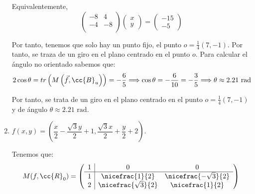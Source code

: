 \begin{ejercicio}
\begin{enumerate}
        Equivalentemente,
        \begin{equation*}
            \left(
            \begin{array}{cc}
                -8 & 4 \\
                -4 & -8 \\
            \end{array}
            \right)
            \left(
            \begin{array}{c}
                x\\y
            \end{array}
            \right)
            = \left(
            \begin{array}{c}
                -15\\-5
            \end{array}
            \right)
        \end{equation*}

        Por tanto, tenemos que solo hay un punto fijo, el punto $o=\frac{1}{4}(7,-1)$. Por tanto, se traza de un giro en el plano centrado en el punto $o$. Para calcular el ángulo no orientado sabemos que:
        \begin{equation*}
            2\cos\theta = tr\left(M\left(\vec{f}, \cc{B}_u\right)\right) = -\frac{6}{5} \Longrightarrow \cos\theta = -\frac{6}{10} = -\frac{3}{5} \Longrightarrow \theta \approx 2.21\text{ rad}
        \end{equation*}

        Por tanto, se trata de un giro en el plano centrado en el punto $o=\frac{1}{4}(7,-1)$ y de ángulo $\theta \approx 2.21\text{ rad}$.

        
        
        \item $f\left(x, y\right) = \left(\dfrac{x}{2} -\dfrac{\sqrt{3} y}{2} + 1,\dfrac{\sqrt{3} x}{2}+ \dfrac{y}{2} + 2\right).$

        Tenemos que:
        \begin{equation*}
            M(f,\cc{R}_0) = \left(
            \begin{array}{c|cc}
                1 & 0 & 0 \\ \hline
                1 & \nicefrac{1}{2} & \nicefrac{-\sqrt{3}}{2} \\
                2 & \nicefrac{\sqrt{3}}{2} & \nicefrac{1}{2} \\
            \end{array}
            \right)
        \end{equation*}


\end{enumerate}
\end{ejercicio}
